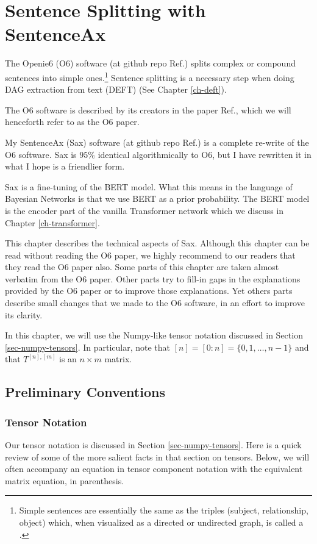\chapter{Sentence Splitting with SentenceAx}
\label{ch-sentence-ax}

The Openie6 (O6) software
(at github repo Ref.\cite{openie6-github})
splits complex or compound 
sentences into
simple ones.\footnote{Simple sentences are essentially
the same  as the triples (subject, relationship, object) which, when visualized as a directed or undirected graph,
is called a  .} Sentence splitting is a necessary step
 when doing
DAG extraction from text (DEFT) (See Chapter \ref{ch-deft}).

The O6 software is described by its creators
 in the paper Ref.\cite{openie6-paper},
 which we will henceforth refer to as 
 the O6 paper.

My SentenceAx (Sax) software (at github repo Ref.\cite{sentence-ax-github}) is a complete re-write of 
the  O6 software.
Sax is $95\%$ identical algorithmically to O6, but I have rewritten it in what I hope is a friendlier form.
 

 Sax is a fine-tuning of the BERT model.
 What this means in the
 language of Bayesian
 Networks is that we use
 BERT as a prior
 probability.
 The BERT model is the encoder part of the
 vanilla Transformer network which
 we discuss in Chapter \ref{ch-transformer}.

 This chapter describes the technical
 aspects of Sax. Although this chapter
 can be read without reading the O6 paper, we highly recommend to
 our readers that they read the O6 paper also.
 Some parts of this chapter are taken almost verbatim
 from the O6 paper. Other parts try to fill-in gaps in the
 explanations provided by the O6 paper or to improve those explanations. Yet others parts describe small changes that we made to the O6 software, in an effort to improve its clarity.




 In this chapter, we
 will use the Numpy-like tensor notation
 discussed in Section
 \ref{sec-numpy-tensors}. In particular, note that $[n] = [0:n] = \{0, 1,\ldots, n-1\}$ and that $T^{[n], [m]}$ is an $n\times m$ matrix.

\section{Preliminary Conventions}

\subsection{Tensor Notation}
Our tensor notation is discussed in Section
\ref{sec-numpy-tensors}.
Here is a quick review
of some of the more salient
facts in that section on tensors.
Below, we will often accompany
  an equation in tensor
  component notation
  with the equivalent matrix equation,
  in parenthesis.
  
